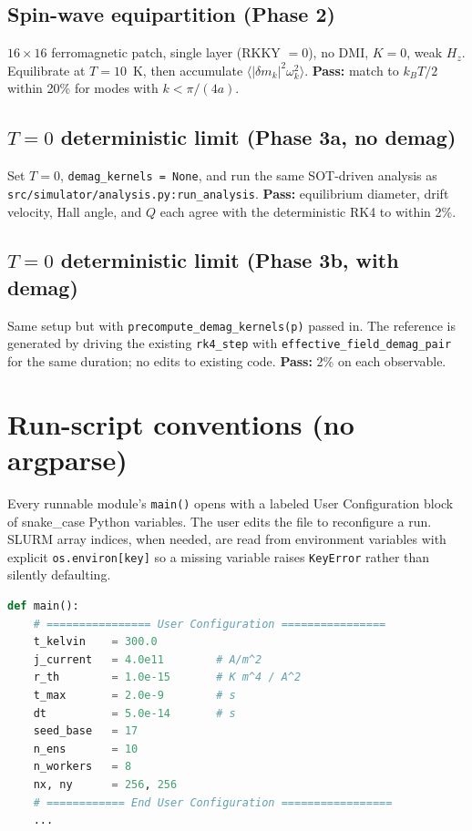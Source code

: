 \documentclass[11pt,a4paper]{article}
\newcommand{\kB}{k_B}
\begin{document}
\subsection{Spin-wave equipartition (Phase 2)}

$16 \times 16$ ferromagnetic patch, single layer (RKKY $= 0$), no
DMI, $K = 0$, weak $H_z$. Equilibrate at $T = 10$~K, then accumulate
$\langle |\delta m_k|^2 \omega_k^2 \rangle$. \textbf{Pass:} match to
$\kB T / 2$ within 20\% for modes with $k < \pi/(4a)$.

\subsection{$T=0$ deterministic limit (Phase 3a, no demag)}

Set $T = 0$, \texttt{demag\_kernels = None}, and run the same
SOT-driven analysis as \texttt{src/simulator/analysis.py:run\_analysis}.
\textbf{Pass:} equilibrium diameter, drift velocity, Hall angle, and
$Q$ each agree with the deterministic RK4 to within 2\%.

\subsection{$T=0$ deterministic limit (Phase 3b, with demag)}

Same setup but with \texttt{precompute\_demag\_kernels(p)} passed
in. The reference is generated by driving the existing
\texttt{rk4\_step} with \texttt{effective\_field\_demag\_pair} for
the same duration; no edits to existing code. \textbf{Pass:} 2\% on
each observable.

\section{Run-script conventions (no argparse)}

Every runnable module's \texttt{main()} opens with a labeled User
Configuration block of snake\_case Python variables. The user edits
the file to reconfigure a run. SLURM array indices, when needed, are
read from environment variables with explicit \texttt{os.environ[key]}
so a missing variable raises \texttt{KeyError} rather than silently
defaulting.

\begin{lstlisting}[language=python]
def main():
    # ================ User Configuration ================
    t_kelvin    = 300.0
    j_current   = 4.0e11        # A/m^2
    r_th        = 1.0e-15       # K m^4 / A^2
    t_max       = 2.0e-9        # s
    dt          = 5.0e-14       # s
    seed_base   = 17
    n_ens       = 10
    n_workers   = 8
    nx, ny      = 256, 256
    # ============ End User Configuration =================
    ...
\end{lstlisting}
\end{document}
